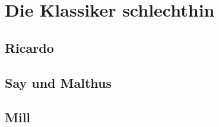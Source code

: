 %
%
%

\chapter{Die Klassiker schlechthin}
\label{Klassik}

\section{Ricardo}

\section{Say und Malthus}
\label{Say_Mal}

\section{Mill}